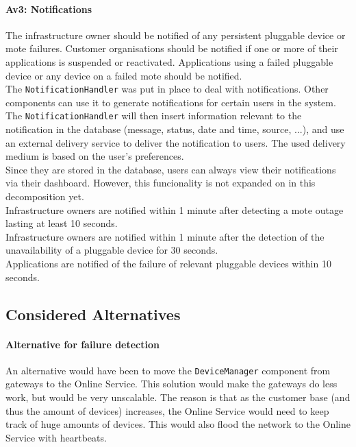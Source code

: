         \paragraph{Av3: Notifications}
            The infrastructure owner should be notified of any persistent
            pluggable device or mote failures. Customer organisations should be
            notified if one or more of their applications is suspended or
            reactivated. Applications using a failed pluggable device or any device
            on a failed mote should be notified. \\
            The \texttt{NotificationHandler} was put in place to deal with
            notifications. Other components can use it to generate notifications for
            certain users in the system. The \texttt{NotificationHandler} will then
            insert information relevant to the notification in the database (message,
            status, date and time, source, ...), and use an external delivery
            service to deliver the notification to users. The used delivery medium
            is based on the user's preferences. \\
            Since they are stored in the database, users can always view
            their notifications via their dashboard. However, this funcionality is not
            expanded on in this decomposition yet. \\

            Infrastructure owners are notified within 1 minute after detecting a mote outage lasting at
            least 10 seconds. \\
            Infrastructure owners are notified within 1 minute after the detection of the unavailability of
            a pluggable device for 30 seconds. \\
            Applications are notified of the failure of relevant pluggable devices within 10 seconds.

        

    \subsection*{Considered Alternatives}
        \paragraph{Alternative for failure detection}
            An alternative would have been to move the \texttt{DeviceManager}
            component from gateways to the Online Service. This solution would make the
            gateways do less work, but would be very unscalable. The reason is
            that as the customer base (and thus the amount of devices) increases,
            the Online Service would need to keep track of huge amounts of devices.
            This would also flood the network to the Online Service with heartbeats.

